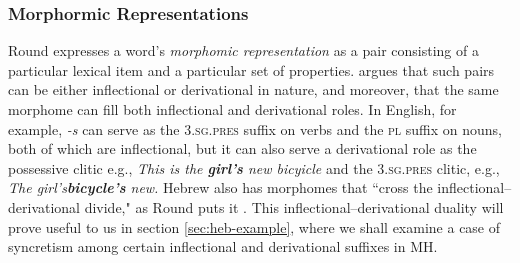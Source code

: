 
\subsubsection{Morphormic Representations}
Round expresses a word's \emph{morphomic representation} as a pair 
consisting of a particular lexical item and a particular set of properties.
\cite{round:2011} argues that such pairs can be either inflectional 
 or derivational in nature, and moreover, that the same morphome can fill 
 both inflectional and derivational roles. In English, for example, \emph{-s} 
 can serve as the \textsc{3.sg.pres} suffix on verbs and the \textsc{pl} 
 suffix on nouns, both of which are inflectional, but it can also serve a derivational 
 role as the possessive clitic e.g., \emph{This is the \textbf{girl's} new bicyicle} and 
 the \textsc{3.sg.pres} clitic, e.g., \emph{The girl's\textbf{bicycle's} new.} 
 Hebrew also has morphomes that ``cross the inflectional--derivational divide," 
 as Round puts it \citep[][p.14]{round:2015}. This inflectional--derivational 
 duality will prove useful to us in section \ref{sec:heb-example}, where we shall 
 examine a case of syncretism among certain inflectional and derivational suffixes in \ac{MH}.

% 
  
